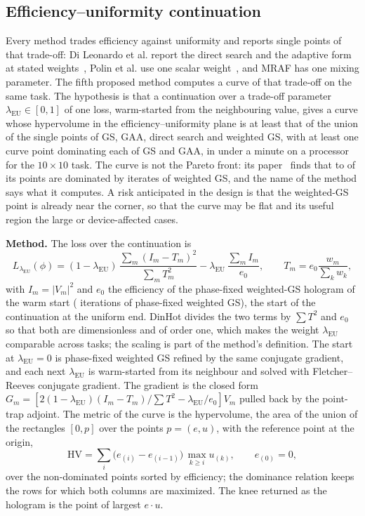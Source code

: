 \subsection{Efficiency--uniformity continuation}\label{sec:b5}

Every method trades efficiency against uniformity and reports single points of that trade-off: Di Leonardo et al. report the direct search and the adaptive form at stated weights~\cite{dileonardo}, Polin et al. use one scalar weight~\cite{polin}, and MRAF has one mixing parameter. The fifth proposed method computes a curve of that trade-off on the same task. The hypothesis is that a continuation over a trade-off parameter $\lambda_{\mathrm{EU}}\in[0,1]$ of one loss, warm-started from the neighbouring value, gives a curve whose hypervolume in the efficiency--uniformity plane is at least that of the union of the single points of GS, GAA, direct search and weighted GS, with at least one curve point dominating each of GS and GAA, in under a minute on a processor for the $10\times10$ task. The curve is not the Pareto front: its paper~\cite{b5paper} finds that  to  of its  points are dominated by iterates of weighted GS, and the name of the method says what it computes. A risk anticipated in the design is that the weighted-GS point is already near the corner, so that the curve may be flat and its useful region the large or device-affected cases.

\textbf{Method.} The loss over the continuation is
\begin{equation}
L_{\lambda_{\mathrm{EU}}}(\phi)=(1-\lambda_{\mathrm{EU}})\,\frac{\sum_m(I_m-T_m)^2}{\sum_mT_m^2}-\lambda_{\mathrm{EU}}\,\frac{\sum_mI_m}{e_0},\qquad T_m=e_0\frac{w_m}{\sum_kw_k},
\label{eq:b5}
\end{equation}
with $I_m=|V_m|^2$ and $e_0$ the efficiency of the phase-fixed weighted-GS hologram of the warm start ( iterations of phase-fixed weighted GS), the start of the continuation at the uniform end. DinHot divides the two terms by $\sum T^2$ and $e_0$ so that both are dimensionless and of order one, which makes the weight $\lambda_{\mathrm{EU}}$ comparable across tasks; the scaling is part of the method's definition. The start at $\lambda_{\mathrm{EU}}=0$ is phase-fixed weighted GS refined by the same conjugate gradient, and each next $\lambda_{\mathrm{EU}}$ is warm-started from its neighbour and solved with Fletcher--Reeves conjugate gradient. The gradient is the closed form $G_m=[2(1-\lambda_{\mathrm{EU}})(I_m-T_m)/\sum T^2-\lambda_{\mathrm{EU}}/e_0]V_m$ pulled back by the point-trap adjoint. The metric of the curve is the hypervolume, the area of the union of the rectangles $[0,p]$ over the points $p=(e,u)$, with the reference point at the origin,
\begin{equation}
\mathrm{HV}=\sum_{i}\big(e_{(i)}-e_{(i-1)}\big)\,\max_{k\ge i}u_{(k)},\qquad e_{(0)}=0,
\label{eq:b5-hv}
\end{equation}
over the non-dominated points sorted by efficiency; the dominance relation keeps the rows for which both columns are maximized. The knee returned as the hologram is the point of largest $e\cdot u$.

